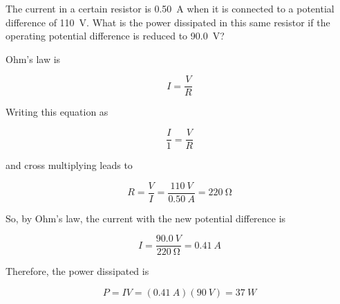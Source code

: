 \documentclass[answers]{exam}
\begin{document}
\begin{questions}
\begin{parts}
\end{parts}

\question
The current in a certain resistor is \SI{0.50}{A} when it is connected to a potential difference of \SI{110}{V}. What is the power dissipated in this same resistor if the operating potential difference is reduced to \SI{90.0}{V}?


\begin{solution}
Ohm's law is

\begin{equation*}
    I = \frac{V}{R}
\end{equation*}

Writing this equation as

\begin{equation*}
    \frac{I}{1} = \frac{V}{R}
\end{equation*}

and cross multiplying leads to

\begin{equation*}
    R = \frac{V}{I} = \frac{\SI{110}{V}}{\SI{0.50}{A}} = \SI{220}{\ohm}
\end{equation*}

So, by Ohm's law, the current with the new potential difference is

\begin{equation*}
    I = \frac{\SI{90.0}{V}}{\SI{220}{\ohm}} = \SI{0.41}{A}
\end{equation*}

Therefore, the power dissipated is

\begin{equation*}
    P = IV = (\SI{0.41}{A})(\SI{90}{V}) = \boxed{\SI{37}{W}}
\end{equation*}

\end{solution}





\end{questions}
\end{document}
